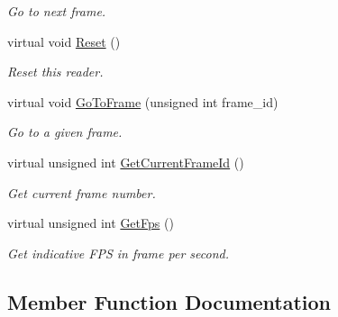 \begin{DoxyCompactItemize}
\begin{DoxyCompactList}\small\item\em Go to next frame. \end{DoxyCompactList}\item 
\mbox{\label{classmoetsi_1_1ssp_1_1VideoFileReader_ac646d10b57d4e3b3ff4d1c83a47e8c3d}} 
virtual void \hyperlink{classmoetsi_1_1ssp_1_1VideoFileReader_ac646d10b57d4e3b3ff4d1c83a47e8c3d}{Reset} ()
\begin{DoxyCompactList}\small\item\em Reset this reader. \end{DoxyCompactList}\item 
virtual void \hyperlink{classmoetsi_1_1ssp_1_1VideoFileReader_ad98a532db8b1e2c3879df274b2efb082}{Go\+To\+Frame} (unsigned int frame\+\_\+id)
\begin{DoxyCompactList}\small\item\em Go to a given frame. \end{DoxyCompactList}\item 
virtual unsigned int \hyperlink{classmoetsi_1_1ssp_1_1VideoFileReader_aef5c92da2645cddc7e4ffcfd34ad4b8a}{Get\+Current\+Frame\+Id} ()
\begin{DoxyCompactList}\small\item\em Get current frame number. \end{DoxyCompactList}\item 
virtual unsigned int \hyperlink{classmoetsi_1_1ssp_1_1VideoFileReader_a83359ad82898acdb75240568b182247c}{Get\+Fps} ()
\begin{DoxyCompactList}\small\item\em Get indicative F\+PS in frame per second. \end{DoxyCompactList}\end{DoxyCompactItemize}


\subsection{Member Function Documentation}
\mbox{\label{classmoetsi_1_1ssp_1_1VideoFileReader_aef5c92da2645cddc7e4ffcfd34ad4b8a}} 
